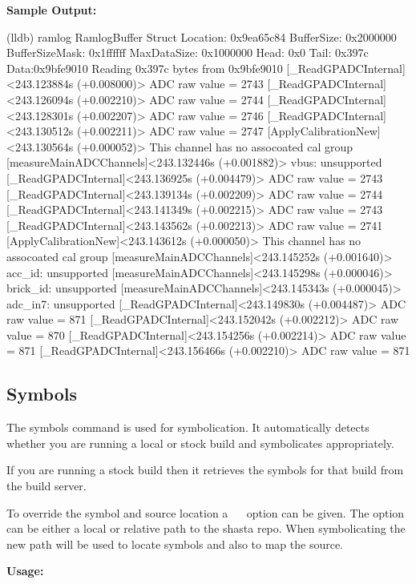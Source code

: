 \textcolor{SmokeyDarkBlue}{\bfseries Sample Output:} \\
\begin{TerminalOutput}
(lldb) ramlog
RamlogBuffer Struct Location: 0x9ea65c84
BufferSize: 0x2000000
BufferSizeMask: 0x1ffffff
MaxDataSize: 0x1000000
Head: 0x0
Tail: 0x397c
Data:0x9bfe9010
Reading 0x397c bytes from 0x9bfe9010
[_ReadGPADCInternal]<243.123884s (+0.008000)> ADC raw value = 2743
[_ReadGPADCInternal]<243.126094s (+0.002210)> ADC raw value = 2744
[_ReadGPADCInternal]<243.128301s (+0.002207)> ADC raw value = 2746
[_ReadGPADCInternal]<243.130512s (+0.002211)> ADC raw value = 2747
[ApplyCalibrationNew]<243.130564s (+0.000052)> This channel has no assocoated cal group
[measureMainADCChannels]<243.132446s (+0.001882)> vbus: unsupported
[_ReadGPADCInternal]<243.136925s (+0.004479)> ADC raw value = 2743
[_ReadGPADCInternal]<243.139134s (+0.002209)> ADC raw value = 2744
[_ReadGPADCInternal]<243.141349s (+0.002215)> ADC raw value = 2743
[_ReadGPADCInternal]<243.143562s (+0.002213)> ADC raw value = 2741
[ApplyCalibrationNew]<243.143612s (+0.000050)> This channel has no assocoated cal group
[measureMainADCChannels]<243.145252s (+0.001640)> acc_id: unsupported
[measureMainADCChannels]<243.145298s (+0.000046)> brick_id: unsupported
[measureMainADCChannels]<243.145343s (+0.000045)> adc_in7: unsupported
[_ReadGPADCInternal]<243.149830s (+0.004487)> ADC raw value = 871
[_ReadGPADCInternal]<243.152042s (+0.002212)> ADC raw value = 870
[_ReadGPADCInternal]<243.154256s (+0.002214)> ADC raw value = 871
[_ReadGPADCInternal]<243.156466s (+0.002210)> ADC raw value = 871
\end{TerminalOutput}

\subsection{Symbols}

The symbols command is used for symbolication. It automatically detects whether
you are running a local or stock build and symbolicates appropriately.

If you are running a stock build then it retrieves the symbols for that build
from the build server.

To override the symbol and source location a ~~ option can be given.
The option can be either a local or relative path to the shasta repo. When symbolicating
the new path will be used to locate symbols and also to map the source.

\textcolor{SmokeyDarkBlue}{\bfseries Usage:} 

